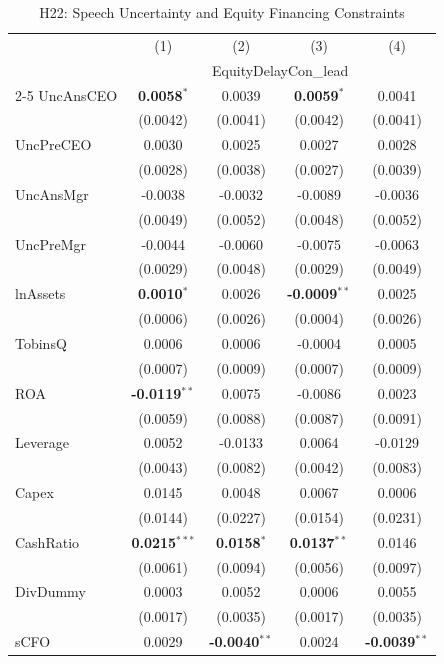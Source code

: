 \documentclass[11pt,a4paper]{article}
\begin{document}
\clearpage
\begin{table}[htbp]
\centering
\caption{H22: Speech Uncertainty and Equity Financing Constraints}
\label{tab:h22}
\scriptsize
\begin{tabular}{lcccc}
\toprule
 & (1) & (2) & (3) & (4) \\
 & \multicolumn{4}{c}{EquityDelayCon\_lead} \\
\cmidrule(lr){2-5}
\midrule
UncAnsCEO & \textbf{0.0058}$^{*}$ & 0.0039 & \textbf{0.0059}$^{*}$ & 0.0041 \\
 & (0.0042) & (0.0041) & (0.0042) & (0.0041) \\
UncPreCEO & 0.0030 & 0.0025 & 0.0027 & 0.0028 \\
 & (0.0028) & (0.0038) & (0.0027) & (0.0039) \\
UncAnsMgr & -0.0038 & -0.0032 & -0.0089 & -0.0036 \\
 & (0.0049) & (0.0052) & (0.0048) & (0.0052) \\
UncPreMgr & -0.0044 & -0.0060 & -0.0075 & -0.0063 \\
 & (0.0029) & (0.0048) & (0.0029) & (0.0049) \\
\midrule
lnAssets & \textbf{0.0010}$^{*}$ & 0.0026 & \textbf{-0.0009}$^{**}$ & 0.0025 \\
 & (0.0006) & (0.0026) & (0.0004) & (0.0026) \\
TobinsQ & 0.0006 & 0.0006 & -0.0004 & 0.0005 \\
 & (0.0007) & (0.0009) & (0.0007) & (0.0009) \\
ROA & \textbf{-0.0119}$^{**}$ & 0.0075 & -0.0086 & 0.0023 \\
 & (0.0059) & (0.0088) & (0.0087) & (0.0091) \\
Leverage & 0.0052 & -0.0133 & 0.0064 & -0.0129 \\
 & (0.0043) & (0.0082) & (0.0042) & (0.0083) \\
Capex & 0.0145 & 0.0048 & 0.0067 & 0.0006 \\
 & (0.0144) & (0.0227) & (0.0154) & (0.0231) \\
CashRatio & \textbf{0.0215}$^{***}$ & \textbf{0.0158}$^{*}$ & \textbf{0.0137}$^{**}$ & 0.0146 \\
 & (0.0061) & (0.0094) & (0.0056) & (0.0097) \\
DivDummy & 0.0003 & 0.0052 & 0.0006 & 0.0055 \\
 & (0.0017) & (0.0035) & (0.0017) & (0.0035) \\
sCFO & 0.0029 & \textbf{-0.0040}$^{**}$ & 0.0024 & \textbf{-0.0039}$^{**}$ \\

\end{tabular}
\end{table}
\end{document}
